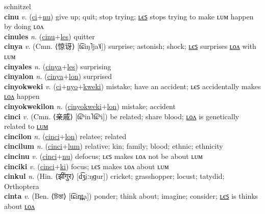 schnitzel \label{'cinitsel} \\
\textbf{cinu} \textit{v.} (\hyperref[ci]{ci}+\hyperref[nu]{nu})
give up; quit; stop trying; \hyperref[cinules]{ʟєꜱ} stops trying to make ʟᴜᴍ happen by doing ʟᴏᴧ \label{cinu} \\
\textbf{cinules} \textit{n.} (\hyperref[cinu]{cinu}+\hyperref[les]{les})
quitter \label{cinules} \\
\textbf{cinya} \textit{v.} (Cmn. ⟨惊讶⟩ [t͡ɕiŋ˥ja˥˩])
surprise; astonish; shock; \hyperref[cinyales]{ʟєꜱ} surprises \hyperref[cinyalon]{ʟᴏᴧ} with ʟᴜᴍ \label{cinya} \\
\textbf{cinyales} \textit{n.} (\hyperref[cinya]{cinya}+\hyperref[les]{les})
surprising \label{cinyales} \\
\textbf{cinyalon} \textit{n.} (\hyperref[cinya]{cinya}+\hyperref[lon]{lon})
surprised \label{cinyalon} \\
\textbf{cinyokweki} \textit{v.} (\hyperref[ci]{ci}+\hyperref[nyo]{nyo}+\hyperref[kweki]{kweki})
mistake; have an accident; ʟєꜱ accidentally makes \hyperref[cinyokwekilon]{ʟᴏᴧ} happen \label{cinyokweki} \\
\textbf{cinyokwekilon} \textit{n.} (\hyperref[cinyokweki]{cinyokweki}+\hyperref[lon]{lon})
mistake; accident \label{cinyokwekilon} \\
\textbf{cinci} \textit{v.} (Cmn. ⟨亲戚⟩ [t͡ɕʰin˥t͡ɕʰi])
be related; share blood; \hyperref[cincilon]{ʟᴏᴧ} is genetically related to \hyperref[cincilum]{ʟᴜᴍ} \label{cinci} \\
\textbf{cincilon} \textit{n.} (\hyperref[cinci]{cinci}+\hyperref[lon]{lon})
relatee; related \label{cincilon} \\
\textbf{cincilum} \textit{n.} (\hyperref[cinci]{cinci}+\hyperref[lum]{lum})
relative; kin; family; blood; ethnic; ethnicity \label{cincilum} \\
\textbf{cincinu} \textit{v.} (\hyperref[cinci]{cinci}+\hyperref[nu]{nu})
defocus; ʟєꜱ makes ʟᴏᴧ not be about ʟᴜᴍ \label{cincinu} \\
\textbf{cinciki} \textit{v.} (\hyperref[cinci]{cinci}+\hyperref[ki]{ki})
focus; ʟєꜱ makes ʟᴏᴧ about ʟᴜᴍ \label{cinciki} \\
\textbf{cinkul} \textit{n.} (Hin. ⟨झींगुर⟩ [d͡ʒ̤iːŋɡur])
cricket; grasshopper; locust; tatydid; Orthoptera \label{cinkul} \\
\textbf{cinta} \textit{v.} (Ben. ⟨চিন্তা⟩ [t͡ɕin̪t̪a])
ponder; think about; imagine; consider; \hyperref[cintales]{ʟєꜱ} is thinks about \hyperref[cintalon]{ʟᴏᴧ} \label{cinta} \\
